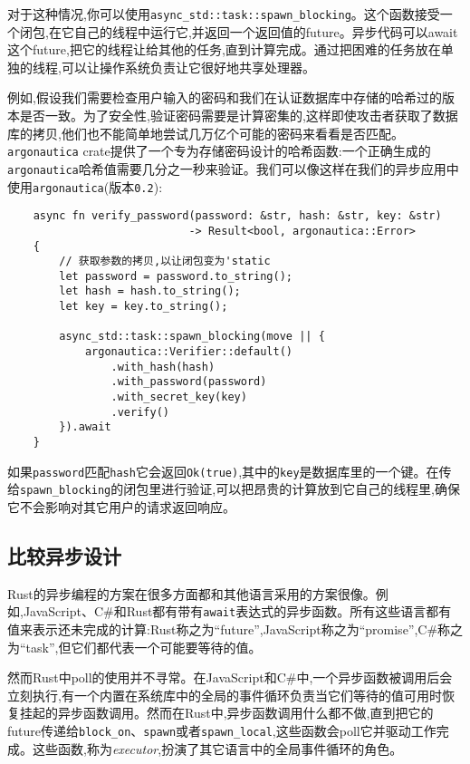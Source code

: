 对于这种情况,你可以使用\texttt{async\_std::task::spawn\_blocking}。这个函数接受一个闭包,在它自己的线程中运行它,并返回一个返回值的future。异步代码可以await这个future,把它的线程让给其他的任务,直到计算完成。通过把困难的任务放在单独的线程,可以让操作系统负责让它很好地共享处理器。

例如,假设我们需要检查用户输入的密码和我们在认证数据库中存储的哈希过的版本是否一致。为了安全性,验证密码需要是计算密集的,这样即使攻击者获取了数据库的拷贝,他们也不能简单地尝试几万亿个可能的密码来看看是否匹配。\texttt{argonautica} crate提供了一个专为存储密码设计的哈希函数:一个正确生成的\texttt{argonautica}哈希值需要几分之一秒来验证。我们可以像这样在我们的异步应用中使用\texttt{argonautica}(版本\texttt{0.2}):
\begin{verbatim}
    async fn verify_password(password: &str, hash: &str, key: &str)
                            -> Result<bool, argonautica::Error>
    {
        // 获取参数的拷贝,以让闭包变为'static
        let password = password.to_string();
        let hash = hash.to_string();
        let key = key.to_string();

        async_std::task::spawn_blocking(move || {
            argonautica::Verifier::default()
                .with_hash(hash)
                .with_password(password)
                .with_secret_key(key)
                .verify()
        }).await
    }
\end{verbatim}

如果\texttt{password}匹配\texttt{hash}它会返回\texttt{Ok(true)},其中的\texttt{key}是数据库里的一个键。在传给\texttt{spawn\_blocking}的闭包里进行验证,可以把昂贵的计算放到它自己的线程里,确保它不会影响对其它用户的请求返回响应。

\subsection{比较异步设计}
Rust的异步编程的方案在很多方面都和其他语言采用的方案很像。例如,JavaScript、C\#和Rust都有带有\texttt{await}表达式的异步函数。所有这些语言都有值来表示还未完成的计算:Rust称之为“future”,JavaScript称之为“promise”,C\#称之为“task”,但它们都代表一个可能要等待的值。

然而Rust中poll的使用并不寻常。在JavaScript和C\#中,一个异步函数被调用后会立刻执行,有一个内置在系统库中的全局的事件循环负责当它们等待的值可用时恢复挂起的异步函数调用。然而在Rust中,异步函数调用什么都不做,直到把它的future传递给\texttt{block\_on}、\texttt{spawn}或者\texttt{spawn\_local},这些函数会poll它并驱动工作完成。这些函数,称为\emph{executor},扮演了其它语言中的全局事件循环的角色。

